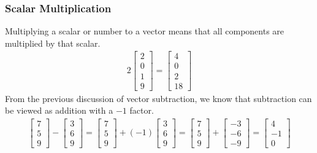 \subsubsection{Scalar Multiplication} 
Multiplying a scalar or number to a vector means that all components are multiplied by that scalar.
\begin{align*}
2
\begin{bmatrix}
2 \\
0 \\
1 \\
9
\end{bmatrix}
=
\begin{bmatrix}
4 \\
0 \\
2 \\
18
\end{bmatrix}
\end{align*}
From the previous discussion of vector subtraction, we know that subtraction can be viewed as addition with a $-1$ factor.
\begin{align*}
\begin{bmatrix}
7 \\
5 \\
9
\end{bmatrix}
-
\begin{bmatrix}
3 \\
6 \\
9
\end{bmatrix}
=
\begin{bmatrix}
7 \\
5 \\
9
\end{bmatrix}
+ (-1)
\begin{bmatrix}
3 \\
6 \\
9
\end{bmatrix}
=
\begin{bmatrix}
7 \\
5 \\
9
\end{bmatrix}
+
\begin{bmatrix}
-3 \\
-6 \\
-9
\end{bmatrix}
=
\begin{bmatrix}
4 \\
-1 \\
0
\end{bmatrix}
\end{align*}

